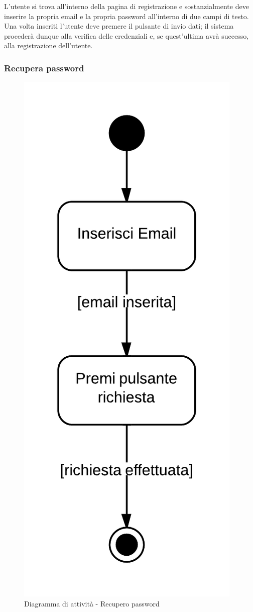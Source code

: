 L'utente si trova all'interno della pagina di registrazione e sostanzialmente deve inserire la propria email e la propria password all'interno di due campi di testo. Una volta inseriti l'utente deve premere il pulsante di invio dati; il sistema  procederà dunque alla verifica delle credenziali e, se quest'ultima avrà successo, alla registrazione dell'utente.

\subsubsection{Recupera password}

\begin{figure}[H]
\centering
\includegraphics[scale=0.2]{uml/MaaP - Recupera password.png}
\caption{Diagramma di attività - Recupero password}
\end{figure}


